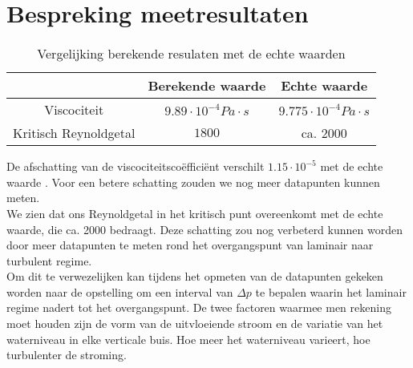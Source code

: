\section{Bespreking meetresultaten}

\begin{table}[H]
    \centering
    \label{tab:vergelijking}
    \caption{Vergelijking berekende resulaten met de echte waarden}
    \begin{tabular}{| c | c | c |}
        \hline
                                & Berekende waarde      & Echte waarde          \\ \hline
        Viscociteit             & $9.89 \cdot 10^{-4} Pa \cdot s$  & $9.775 \cdot 10^{-4}Pa \cdot s$ \\ \hline
        Kritisch Reynoldgetal   & $1800$                & ca. $2000$            \\ \hline
    \end{tabular}
\end{table}

De afschatting van de viscociteitsco\"effici\"ent verschilt $1.15 \cdot 10^{-5}$ met de echte waarde \cite{viscocity}.
Voor een betere schatting zouden we nog meer datapunten kunnen meten.
\\

We zien dat ons Reynoldgetal in het kritisch punt overeenkomt met de echte waarde, die ca. 2000 bedraagt. 
Deze schatting zou nog verbeterd kunnen worden door meer datapunten te meten rond het overgangspunt van 
laminair naar turbulent regime. \\

Om dit te verwezelijken kan tijdens het opmeten van de datapunten gekeken worden naar de opstelling om een
interval van $\Delta p$ te bepalen waarin het laminair regime nadert tot het overgangspunt. De twee factoren waarmee 
men rekening moet houden zijn de vorm van de uitvloeiende stroom en de variatie van het waterniveau in elke verticale buis.
Hoe meer het waterniveau varieert, hoe turbulenter de stroming.
